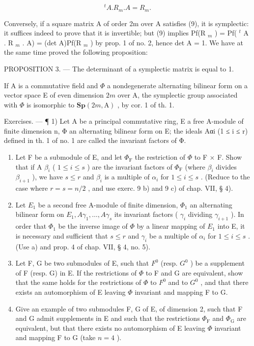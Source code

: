 \[
{ } ^ { t } A . R _ { m } . A = R _ { m } .\tag{9}
\]

Conversely, if a square matrix A of order 2m over A satisfies (9), it is symplectic: it suffices indeed to prove that it is invertible; but (9) implies Pf(R \(_{m}\) ) = Pf( \(^{t}\) A . R \(_{m}\) . A) = (det A)Pf(R \(_{m}\) ) by prop. 1 of no. 2, hence det A = 1. We have at the same time proved the following proposition:

PROPOSITION 3. --- The determinant of a symplectic matrix is equal to 1.

If A is a commutative field and \(\Phi\) a nondegenerate alternating bilinear form on a vector space E of even dimension \(2m\) over A, the symplectic group associated with \(\Phi\) is isomorphic to \(\mathbf{Sp}(2m, \mathrm{A})\) , by cor. 1 of th. 1.

Exercises. --- ¶ 1) Let A be a principal commutative ring, E a free A-module of finite dimension n, Φ an alternating bilinear form on E; the ideals Aαi (1 ≤ i ≤ r) defined in th. 1 of no. 1 are called the invariant factors of Φ.

\begin{enumerate}
\def\labelenumi{\alph{enumi})}
\item
  Let F be a submodule of E, and let \(\Phi_{\mathrm{F}}\) the restriction of \(\Phi\) to F × F. Show that if A \(\beta_{i}\) ( \(1 \leqslant i \leqslant s\) ) are the invariant factors of \(\Phi_{\mathrm{F}}\) (where \(\beta_{i}\) divides \(\beta_{i+1}\) ), we have \(s \leqslant r\) and \(\beta_{i}\) is a multiple of \(\alpha_{i}\) for \(1 \leqslant i \leqslant s\) . (Reduce to the case where \(r = s = n/2\) , and use exerc. 9 b) and 9 c) of chap. VII, § 4).
\item
  Let \(E_{1}\) be a second free A-module of finite dimension, \(\Phi_{1}\) an alternating bilinear form on \(E_{1}, A\gamma_{1}, \ldots, A\gamma_{s}\) its invariant factors ( \(\gamma_{i}\) dividing \(\gamma_{i+1}\) ). In order that \(\Phi_{1}\) be the inverse image of \(\Phi\) by a linear mapping of \(E_{1}\) into E, it is necessary and sufficient that \(s \leqslant r\) and \(\gamma_{i}\) be a multiple of \(\alpha_{i}\) for \(1 \leqslant i \leqslant s\) . (Use a) and prop. 4 of chap. VII, § 4, no. 5).
\item
  Let F, G be two submodules of E, such that \(F^{0}\) (resp. \(G^{0}\) ) be a supplement of F (resp. G) in E. If the restrictions of \(\Phi\) to F and G are equivalent, show that the same holds for the restrictions of \(\Phi\) to \(F^{0}\) and to \(G^{0}\) , and that there exists an automorphism of E leaving \(\Phi\) invariant and mapping F to G.
\item
  Give an example of two submodules F, G of E, of dimension 2, such that F and G admit supplements in E and such that the restrictions \(\Phi_{\mathrm{F}}\) and \(\Phi_{\mathrm{G}}\) are equivalent, but that there exists no automorphism of E leaving \(\Phi\) invariant and mapping F to G (take \(n = 4\) ).
\end{enumerate}

